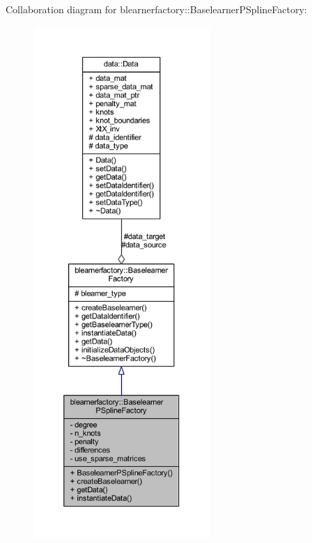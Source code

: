 Collaboration diagram for blearnerfactory\+:\+:Baselearner\+P\+Spline\+Factory\+:
\nopagebreak
\begin{figure}[H]
\begin{center}
\leavevmode
\includegraphics[height=550pt]{classblearnerfactory_1_1_baselearner_p_spline_factory__coll__graph}
\end{center}
\end{figure}
